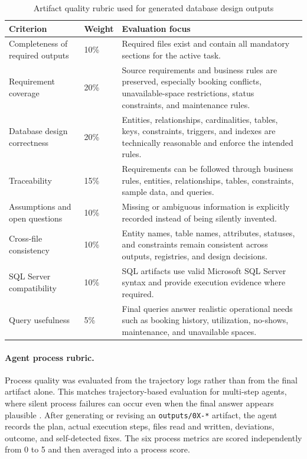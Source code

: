 \begin{table}[htbp]
\centering
\small
\begin{tabularx}{\textwidth}{p{}p{}X}
\toprule
\textbf{Criterion} & \textbf{Weight} & \textbf{Evaluation focus} \\
\midrule
Completeness of required outputs & 10\% & Required files exist and contain all mandatory sections for the active task. \\
Requirement coverage & 20\% & Source requirements and business rules are preserved, especially booking conflicts, unavailable-space restrictions, status constraints, and maintenance rules. \\
Database design correctness & 20\% & Entities, relationships, cardinalities, tables, keys, constraints, triggers, and indexes are technically reasonable and enforce the intended rules. \\
Traceability & 15\% & Requirements can be followed through business rules, entities, relationships, tables, constraints, sample data, and queries. \\
Assumptions and open questions & 10\% & Missing or ambiguous information is explicitly recorded instead of being silently invented. \\
Cross-file consistency & 10\% & Entity names, table names, attributes, statuses, and constraints remain consistent across outputs, registries, and design decisions. \\
SQL Server compatibility & 10\% & SQL artifacts use valid Microsoft SQL Server syntax and provide execution evidence where required. \\
Query usefulness & 5\% & Final queries answer realistic operational needs such as booking history, utilization, no-shows, maintenance, and unavailable spaces. \\
\bottomrule
\end{tabularx}
\caption{Artifact quality rubric used for generated database design outputs}
\label{tab:artifact-rubric}
\end{table}

\paragraph{Agent process rubric.}
Process quality was evaluated from the trajectory logs rather than from the final artifact alone. This matches trajectory-based evaluation for multi-step agents, where silent process failures can occur even when the final answer appears plausible \cite{google-agent-eval,openlayer-agent-eval}. After generating or revising an \texttt{outputs/0X-*} artifact, the agent records the plan, actual execution steps, files read and written, deviations, outcome, and self-detected fixes. The six process metrics are scored independently from 0 to 5 and then averaged into a process score.

